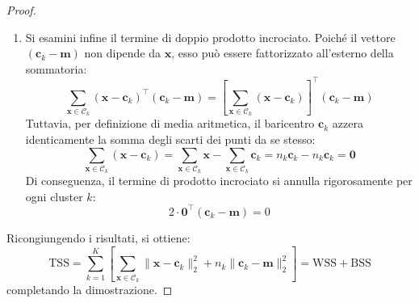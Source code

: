 \begin{proof}
\begin{enumerate}
    \item Si esamini infine il termine di doppio prodotto incrociato. Poiché il vettore $(\mathbf{c}_k - \mathbf{m})$ non dipende da $\mathbf{x}$, esso può essere fattorizzato all'esterno della sommatoria:
    \begin{equation}
    \sum_{\mathbf{x} \in \mathcal{C}_k} (\mathbf{x} - \mathbf{c}_k)^\top (\mathbf{c}_k - \mathbf{m}) = \left[ \sum_{\mathbf{x} \in \mathcal{C}_k} (\mathbf{x} - \mathbf{c}_k) \right]^\top (\mathbf{c}_k - \mathbf{m})
    \end{equation}
    Tuttavia, per definizione di media aritmetica, il baricentro $\mathbf{c}_k$ azzera identicamente la somma degli scarti dei punti da se stesso:
    \begin{equation}
    \sum_{\mathbf{x} \in \mathcal{C}_k} (\mathbf{x} - \mathbf{c}_k) = \sum_{\mathbf{x} \in \mathcal{C}_k} \mathbf{x} - \sum_{\mathbf{x} \in \mathcal{C}_k} \mathbf{c}_k = n_k \mathbf{c}_k - n_k \mathbf{c}_k = \mathbf{0}
    \end{equation}
    Di conseguenza, il termine di prodotto incrociato si annulla rigorosamente per ogni cluster $k$:
    \begin{equation}
    2 \cdot \mathbf{0}^\top (\mathbf{c}_k - \mathbf{m}) = 0
    \end{equation}
\end{enumerate}
Ricongiungendo i risultati, si ottiene:
\begin{equation}
\mathrm{TSS} = \sum_{k=1}^K \left[ \sum_{\mathbf{x} \in \mathcal{C}_k} \|\mathbf{x} - \mathbf{c}_k\|_2^2 + n_k \|\mathbf{c}_k - \mathbf{m}\|_2^2 \right] = \mathrm{WSS} + \mathrm{BSS}
\end{equation}
completando la dimostrazione.
\end{proof}


